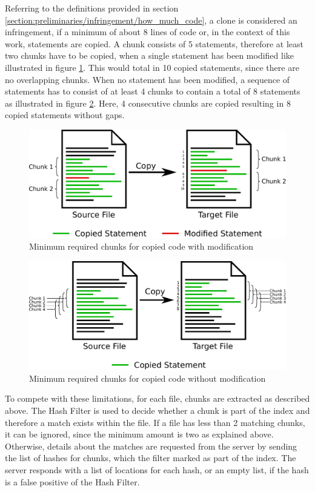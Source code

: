 Referring to the definitions provided in section \ref{section:preliminaries/infringement/how_much_code}, a clone is considered an infringement, if a minimum of about 8 lines of code or, in the context of this work, statements are copied.
A chunk consists of 5 statements, therefore at least two chunks have to be copied, when a single statement has been modified like illustrated in figure \ref{fig:required_chunks_modified}.
This would total in 10 copied statements, since there are no overlapping chunks.
When no statement has been modified, a sequence of statements has to consist of at least 4 chunks to contain a total of 8 statements as illustrated in figure \ref{fig:required_chunks}.
Here, 4 consecutive chunks are copied resulting in 8 copied statements without gaps.

\begin{figure}[h]
	\centering
	\includegraphics[width=0.9\linewidth]{figures/required_chunks_modified.pdf}
	\caption{Minimum required chunks for copied code with modification}\label{fig:required_chunks_modified}
\end{figure}

\begin{figure}[h]
	\centering
	\includegraphics[width=0.9\linewidth]{figures/required_chunks.pdf}
	\caption{Minimum required chunks for copied code without modification}\label{fig:required_chunks}
\end{figure}

To compete with these limitations, for each file, chunks are extracted as described above.
The Hash Filter is used to decide whether a chunk is part of the index and therefore a match exists within the file.
If a file has less than 2 matching chunks, it can be ignored, since the minimum amount is two as explained above.
Otherwise, details about the matches are requested from the server by sending the list of hashes for chunks, which the filter marked as part of the index.
The server responds with a list of locations for each hash, or an empty list, if the hash is a false positive of the Hash Filter.

